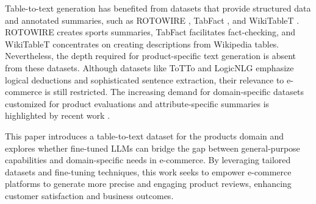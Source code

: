 Table-to-text generation has benefited from datasets that provide structured data and annotated summaries, such as ROTOWIRE \cite{wiseman2017challengesdatatodocumentgeneration}, TabFact \cite{2019TabFactA}, and WikiTableT \cite{chen2021wikitabletlargescaledatatotextdataset}.  ROTOWIRE creates sports summaries, TabFact facilitates fact-checking, and WikiTableT concentrates on creating descriptions from Wikipedia tables. Nevertheless, the depth required for product-specific text generation is absent from these datasets. Although datasets like ToTTo \cite{parikh2020tottocontrolledtabletotextgeneration} and LogicNLG \cite{chen2020logicalnaturallanguagegeneration} emphasize logical deductions and sophisticated sentence extraction, their relevance to e-commerce is still restricted. The increasing demand for domain-specific datasets customized for product evaluations and attribute-specific summaries is highlighted by recent work \cite{He2023ReviewOS}.

This paper introduces a table-to-text dataset for the products domain and explores whether fine-tuned LLMs can bridge the gap between general-purpose capabilities and domain-specific needs in e-commerce. By leveraging tailored datasets and fine-tuning techniques, this work seeks to empower e-commerce platforms to generate more precise and engaging product reviews, enhancing customer satisfaction and business outcomes.
